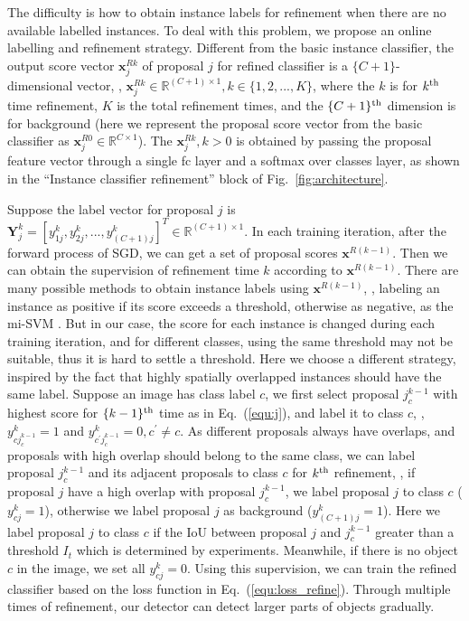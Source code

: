 \documentclass[10pt,twocolumn,letterpaper]{article}
\begin{document}
The difficulty is how to obtain instance labels for refinement when there are no available labelled instances.
To deal with this problem, we propose an online labelling and refinement strategy.
Different from the basic instance classifier, the output score vector $\mathbf{x}^{Rk}_{j}$ of proposal $j$ for refined classifier is a $\{C+1\}$-dimensional vector, \ie, $\mathbf{x}^{Rk}_{j} \in \mathbb{R}^{(C+1)\times1}, k \in \{1, 2, ..., K\}$, where the $k$ is for $k^{\textup{th}}$ time refinement, $K$ is the total refinement times, and the $\{C+1\}^{\textup{th}}$ dimension is for background (here we represent the proposal score vector from the basic classifier as $\mathbf{x}^{R0}_{j} \in \mathbb{R}^{C\times1}$).
The $\mathbf{x}^{Rk}_{j}, k>0$ is obtained by passing the proposal feature vector through a single fc layer and a softmax over classes layer, as shown in the ``Instance classifier refinement'' block of Fig.~\ref{fig:architecture}.

Suppose the label vector for proposal $j$ is $\mathbf{Y}^{k}_{j} = [y^{k}_{1j}, y^{k}_{2j}, ..., y^{k}_{(C+1)j}]^{T} \in \mathbb{R}^{(C+1) \times 1}$.
In each training iteration, after the forward process of SGD, we can get a set of proposal scores $\mathbf{x}^{R(k-1)}$.
Then we can obtain the supervision of refinement time $k$ according to $\mathbf{x}^{R(k-1)}$.
There are many possible methods to obtain instance labels using $\mathbf{x}^{R(k-1)}$, \eg, labeling an instance as positive if its score exceeds a threshold, otherwise as negative, as the mi-SVM \cite{Ref:Andrews2002}.
But in our case, the score for each instance is changed during each training iteration, and for different classes, using the same threshold may not be suitable, thus it is hard to settle a threshold.
Here we choose a different strategy, inspired by the fact that highly spatially overlapped instances should have the same label.
Suppose an image has class label $c$, we first select proposal $j^{k-1}_{c}$ with highest score for $\{k-1\}^{\textup{th}}$ time as in Eq.~(\ref{equ:j}), and label it to class $c$, \ie, $y^{k}_{cj^{k-1}_{c}} = 1$ and $y^{k}_{c^{\prime}j^{k-1}_{c}} = 0, c^{\prime} \ne c$.
As different proposals always have overlaps, and proposals with high overlap should belong to the same class, we can label proposal $j^{k-1}_{c}$ and its adjacent proposals to class $c$ for $k^{\textup{th}}$ refinement, \ie, if proposal $j$ have a high overlap with proposal $j^{k-1}_{c}$, we label proposal $j$ to class $c$ ($y^{k}_{cj} = 1$), otherwise we label proposal $j$ as background ($y^{k}_{(C+1)j} = 1$).
Here we label proposal $j$ to class $c$ if the IoU between proposal $j$ and $j^{k-1}_{c}$ greater than a threshold $I_{t}$ which is determined by experiments.
Meanwhile, if there is no object $c$ in the image, we set all $y^{k}_{cj} = 0$.
Using this supervision, we can train the refined classifier based on the loss function in Eq.~(\ref{equ:loss_refine}).
Through multiple times of refinement, our detector can detect larger parts of objects gradually.
\end{document}
